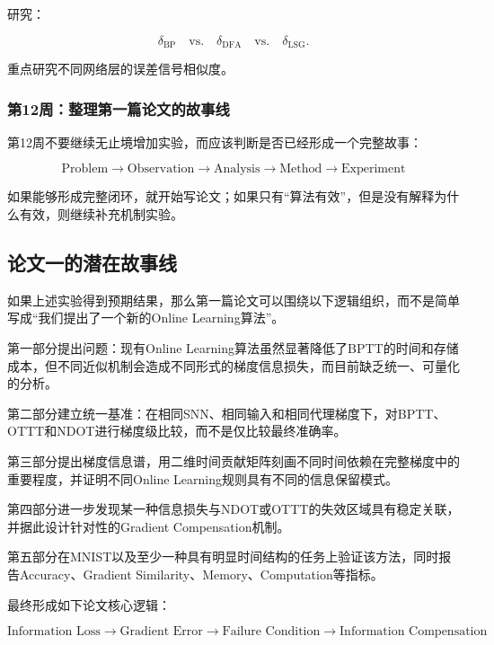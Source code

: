 \documentclass[journal,12pt,onecolumn]{IEEEtran}
\begin{document}
研究：

\[
\delta_{\mathrm{BP}}
\quad
\text{vs.}
\quad
\delta_{\mathrm{DFA}}
\quad
\text{vs.}
\quad
\delta_{\mathrm{LSG}}.
\]

重点研究不同网络层的误差信号相似度。

\subsubsection{第12周：整理第一篇论文的故事线}

第12周不要继续无止境增加实验，而应该判断是否已经形成一个完整故事：

\[
\boxed{
\text{Problem}
\rightarrow
\text{Observation}
\rightarrow
\text{Analysis}
\rightarrow
\text{Method}
\rightarrow
\text{Experiment}
}
\]

如果能够形成完整闭环，就开始写论文；如果只有“算法有效”，但是没有解释为什么有效，则继续补充机制实验。


\subsection{论文一的潜在故事线}

如果上述实验得到预期结果，那么第一篇论文可以围绕以下逻辑组织，而不是简单写成“我们提出了一个新的Online Learning算法”。

第一部分提出问题：现有Online Learning算法虽然显著降低了BPTT的时间和存储成本，但不同近似机制会造成不同形式的梯度信息损失，而目前缺乏统一、可量化的分析。

第二部分建立统一基准：在相同SNN、相同输入和相同代理梯度下，对BPTT、OTTT和NDOT进行梯度级比较，而不是仅比较最终准确率。

第三部分提出梯度信息谱，用二维时间贡献矩阵刻画不同时间依赖在完整梯度中的重要程度，并证明不同Online Learning规则具有不同的信息保留模式。

第四部分进一步发现某一种信息损失与NDOT或OTTT的失效区域具有稳定关联，并据此设计针对性的Gradient Compensation机制。

第五部分在MNIST以及至少一种具有明显时间结构的任务上验证该方法，同时报告Accuracy、Gradient Similarity、Memory、Computation等指标。

最终形成如下论文核心逻辑：

\[
\boxed{
\text{Information Loss}
\rightarrow
\text{Gradient Error}
\rightarrow
\text{Failure Condition}
\rightarrow
\text{Information Compensation}
}
\]
\end{document}
